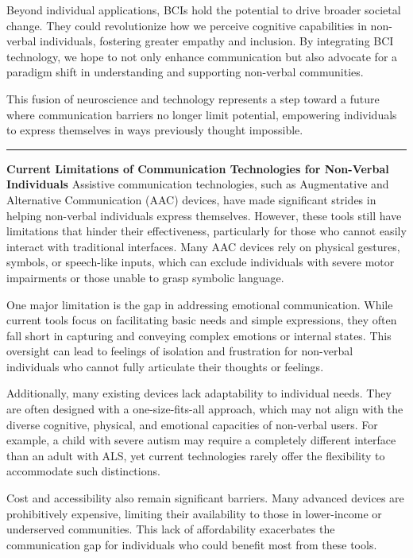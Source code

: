 \documentclass[12pt, research paper]{report}
\begin{document}
	\noindent Beyond individual applications, BCIs hold the potential to drive broader societal change. They could revolutionize how we perceive cognitive capabilities in non-verbal individuals, fostering greater empathy and inclusion. By integrating BCI technology, we hope to not only enhance communication but also advocate for a paradigm shift in understanding and supporting non-verbal communities.
	\bigskip 
	
	\noindent This fusion of neuroscience and technology represents a step toward a future where communication barriers no longer limit potential, empowering individuals to express themselves in ways previously thought impossible.
	
	\noindent \rule{13.85cm}{0.01cm}
	\textbf{Current Limitations of Communication Technologies for Non-Verbal Individuals}
	\newline Assistive communication technologies, such as Augmentative and Alternative Communication (AAC) devices, have made significant strides in helping non-verbal individuals express themselves. However, these tools still have limitations that hinder their effectiveness, particularly for those who cannot easily interact with traditional interfaces. Many AAC devices rely on physical gestures, symbols, or speech-like inputs, which can exclude individuals with severe motor impairments or those unable to grasp symbolic language.
	\bigskip 
	
	\noindent One major limitation is the gap in addressing emotional communication. While current tools focus on facilitating basic needs and simple expressions, they often fall short in capturing and conveying complex emotions or internal states. This oversight can lead to feelings of isolation and frustration for non-verbal individuals who cannot fully articulate their thoughts or feelings.
	\bigskip 
	
	\noindent Additionally, many existing devices lack adaptability to individual needs. They are often designed with a one-size-fits-all approach, which may not align with the diverse cognitive, physical, and emotional capacities of non-verbal users. For example, a child with severe autism may require a completely different interface than an adult with ALS, yet current technologies rarely offer the flexibility to accommodate such distinctions.
	\bigskip 
	
	\noindent Cost and accessibility also remain significant barriers. Many advanced devices are prohibitively expensive, limiting their availability to those in lower-income or underserved communities. This lack of affordability exacerbates the communication gap for individuals who could benefit most from these tools.
	\bigskip 
	
\end{document}
